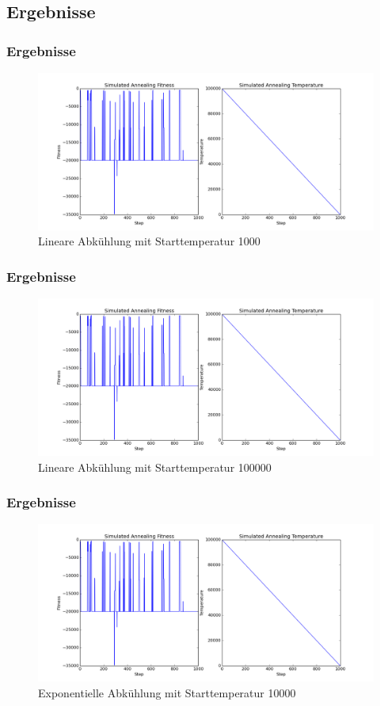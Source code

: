 \subsection{Ergebnisse}

\begin{frame}
\frametitle{Ergebnisse}
    \begin{figure}
        \includegraphics[width=\textwidth]{sa-gs/lin_doof.png}
        \caption{Lineare Abkühlung mit Starttemperatur 1000}
    \end{figure}
\end{frame}


\begin{frame}
\frametitle{Ergebnisse}
    \begin{figure}
        \includegraphics[width=\textwidth]{sa-gs/lin_doof.png}
        \caption{Lineare Abkühlung mit Starttemperatur 100000}
    \end{figure}
\end{frame}

\begin{frame}
\frametitle{Ergebnisse}
    \begin{figure}
        \includegraphics[width=\textwidth]{sa-gs/lin_doof.png}
        \caption{Exponentielle Abkühlung mit Starttemperatur 10000}
    \end{figure}
\end{frame}

